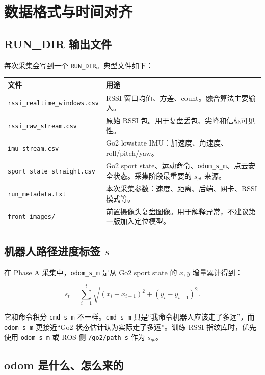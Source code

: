 \documentclass[11pt,a4paper,openany]{report}
\newcommand{\code}[1]{\nolinkurl{#1}}
\newcommand{\file}[1]{\nolinkurl{#1}}
\newcommand{\topic}[1]{\nolinkurl{#1}}
\newcommand{\csvcol}[1]{\nolinkurl{#1}}
\begin{document}
\chapter{数据格式与时间对齐}
\label{chap:data}

\section{RUN\_DIR 输出文件}

每次采集会写到一个 \code{RUN_DIR}。典型文件如下：

\begin{longtable}{p{}p{}}
\toprule
文件 & 用途 \\
\midrule
\file{rssi_realtime_windows.csv} & RSSI 窗口均值、方差、count。融合算法主要输入。 \\
\file{rssi_raw_stream.csv} & 原始 RSSI 包。用于复盘丢包、尖峰和信标可见性。 \\
\file{imu_stream.csv} & Go2 lowstate IMU：加速度、角速度、roll/pitch/yaw。 \\
\file{sport_state_straight.csv} & Go2 sport state、运动命令、\csvcol{odom_s_m}、点云安全状态。采集阶段最重要的 \(s_{gt}\) 来源。 \\
\file{run_metadata.txt} & 本次采集参数：速度、距离、后端、网卡、RSSI 模式等。 \\
\file{front_images/} & 前置摄像头复盘图像。用于解释异常，不建议第一版加入定位模型。 \\
\bottomrule
\end{longtable}

\section{机器人路径进度标签 \(s\)}

在 Phase A 采集中，\csvcol{odom_s_m} 是从 Go2 sport state 的 \(x,y\) 增量累计得到：

\[
  s_t = \sum_{i=1}^{t} \sqrt{(x_i-x_{i-1})^2 + (y_i-y_{i-1})^2}.
\]

它和命令积分 \csvcol{cmd_s_m} 不一样。\csvcol{cmd_s_m} 只是“我命令机器人应该走了多远”，而 \csvcol{odom_s_m} 更接近“Go2 状态估计认为实际走了多远”。训练 RSSI 指纹库时，优先使用 \csvcol{odom_s_m} 或 ROS 侧 \topic{/go2/path_s} 作为 \(s_{gt}\)。

\section{odom 是什么、怎么来的}
\end{document}
